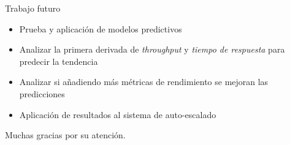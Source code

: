 \documentclass[12pt, spanish]{beamer}
\begin{document}

\begin{frame}{Trabajo futuro}
    \begin{itemize}
        \item Prueba y aplicación de modelos predictivos\vspace{0.5cm}
        \item Analizar la primera derivada de \textit{throughput} y \textit{tiempo de respuesta} para predecir la tendencia\vspace{0.5cm}
        \item Analizar si añadiendo más métricas de rendimiento se mejoran las predicciones\vspace{0.5cm}
        \item Aplicación de resultados al sistema de auto-escalado
    \end{itemize}
\end{frame}


\begin{frame}%
    \centering
    Muchas gracias por su atención.
\end{frame}

\end{document}
